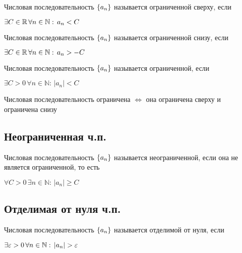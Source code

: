 {
    Числовая последовательность $ \{ a_n \} $ называется ограниченной сверху, если

    $ \exists C \in \Rset \, \forall n \in \mathbb{N}: \, a_n < C $
}

{
    Числовая последовательность $ \{ a_n \} $ называется ограниченной снизу, если

    $ \exists C \in \Rset \, \forall n \in \mathbb{N}: \, a_n > -C $
}

{
    Числовая последовательность $ \{ a_n \} $ называется ограниченной, если

    $ \exists C > 0 \, \forall n \in \mathbb{N}: \, | a_n | < C $
}


\nt
{
    Числовая последовательность ограничена $ \iff $ она ограничена сверху и ограничена снизу
}

\subsection{Неограниченная ч.п.}

{
    Числовая последовательность $ \{ a_n \} $ называется неограниченной, если она не является ограниченной, то есть

    $ \forall C > 0 \, \exists n \in \mathbb{N}: \, | a_n | \ge C $
}


\subsection{Отделимая от нуля ч.п.}

{
    Числовая последовательность $ \{ a_n \} $ называется отделимой от нуля, если

    $ \exists \varepsilon > 0 \, \forall n \in \mathbb{N}: \, | a_n | > \varepsilon $
}


